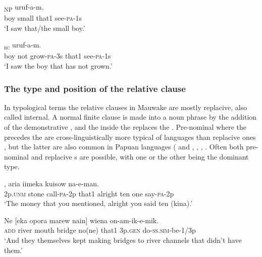 \ea%
\label{ex:8:x1527}
\textsubscript{NP}  uruf-a-m.\\
boy  small  that1  see-\textsc{pa}-1s      \\
\glt`I saw that/the small boy.'
\z


\ea%
\label{ex:8:x1528}
\textsubscript{\textsc{rc}}  uruf-a-m. \\
boy  not  grow-\textsc{pa}-3s that1 see-\textsc{pa}-1s \\
\glt`I saw the boy that has not grown.'
\z


\subsubsection{The type and position of the relative clause}

In typological terms the relative clauses in Mauwake are mostly replacive, also called internal. A normal finite clause is made into a noun phrase by the addition of the demonstrative , and the  inside the  replaces the . Pre-nominal  where the precedes the  are cross-linguistically more typical of  languages than replacive ones \citep[144]{Keenan1985}, but the latter are also common in Papuan languages (\citealt[229]{Reesink1983b} and \citealt[219]{Reesink1987}, \citealt[49]{Roberts1987}, \citealt[281]{Farr1999}, \citealt[193]{Whitehead2004}. Often both pre-nominal and replacive s are possible, with one or the other being the dominant type.

\ea%
\label{ex:8:x1529}
,  aria  iimeka  kuisow  na-e-man. \\
2p.\textsc{unm} stone call-\textsc{pa}-2p that1 alright ten one say-\textsc{pa}-2p      \\
\glt`The money that you mentioned, alright you said ten (kina).'
\z


\ea%
\label{ex:8:x1530}
\gll Ne  [eka  opora    marew  nain]  wiena on-am-ik-e-mik. \\
\textsc{add} river  mouth  bridge  no(ne)  that1  3p.\textsc{gen} do-\textsc{ss}.\textsc{sim}-be-1/3p\\
\glt`And they themselves kept making bridges to river channels that didn't have them.' 
\z


